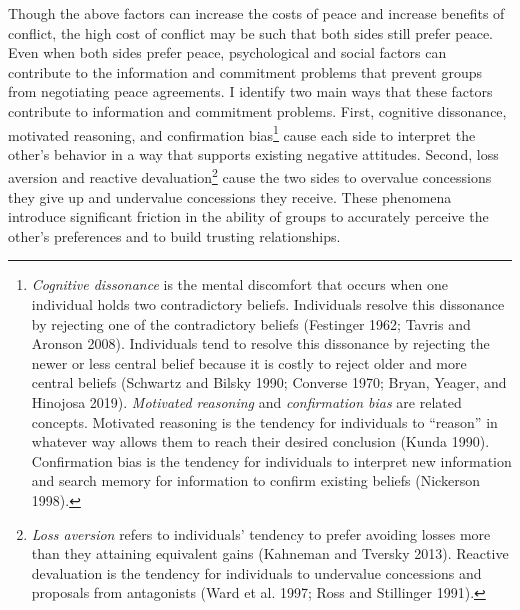 \documentclass[11pt]{article}
\begin{document}
Though the above factors can increase the costs of peace and increase
benefits of conflict, the high cost of conflict may be such that both
sides still prefer peace. Even when both sides prefer peace,
psychological and social factors can contribute to the information and
commitment problems that prevent groups from negotiating peace
agreements. I identify two main ways that these factors contribute to
information and commitment problems. First, cognitive dissonance,
motivated reasoning, and confirmation bias\footnote{\emph{Cognitive
  dissonance} is the mental discomfort that occurs when one individual
  holds two contradictory beliefs. Individuals resolve this dissonance
  by rejecting one of the contradictory beliefs (Festinger 1962; Tavris
  and Aronson 2008). Individuals tend to resolve this dissonance by
  rejecting the newer or less central belief because it is costly to
  reject older and more central beliefs (Schwartz and Bilsky 1990;
  Converse 1970; Bryan, Yeager, and Hinojosa 2019). \emph{Motivated
  reasoning} and \emph{confirmation bias} are related concepts.
  Motivated reasoning is the tendency for individuals to ``reason'' in
  whatever way allows them to reach their desired conclusion (Kunda
  1990). Confirmation bias is the tendency for individuals to interpret
  new information and search memory for information to confirm existing
  beliefs (Nickerson 1998).} cause each side to interpret the other's
behavior in a way that supports existing negative attitudes. Second,
loss aversion and reactive devaluation\footnote{\emph{Loss aversion}
  refers to individuals' tendency to prefer avoiding losses more than
  they attaining equivalent gains (Kahneman and Tversky 2013). Reactive
  devaluation is the tendency for individuals to undervalue concessions
  and proposals from antagonists (Ward et al. 1997; Ross and Stillinger
  1991).} cause the two sides to overvalue concessions they give up and
undervalue concessions they receive. These phenomena introduce
significant friction in the ability of groups to accurately perceive the
other's preferences and to build trusting relationships.
\end{document}
